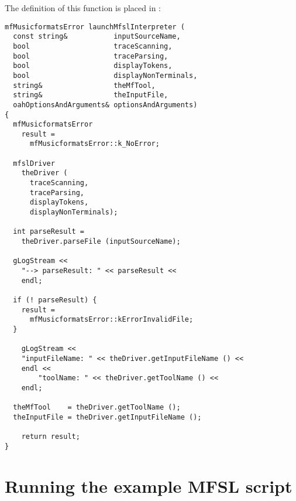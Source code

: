 The definition of this function is placed in :
\begin{lstlisting}[language=Terminal]
mfMusicformatsError launchMfslInterpreter (
  const string&           inputSourceName,
  bool                    traceScanning,
  bool                    traceParsing,
  bool                    displayTokens,
  bool                    displayNonTerminals,
  string&                 theMfTool,
  string&                 theInputFile,
  oahOptionsAndArguments& optionsAndArguments)
{
  mfMusicformatsError
    result =
      mfMusicformatsError::k_NoError;

  mfslDriver
    theDriver (
      traceScanning,
      traceParsing,
      displayTokens,
      displayNonTerminals);

  int parseResult =
  	theDriver.parseFile (inputSourceName);

  gLogStream <<
    "--> parseResult: " << parseResult <<
    endl;

  if (! parseResult) {
    result =
      mfMusicformatsError::kErrorInvalidFile;
  }

	gLogStream <<
    "inputFileName: " << theDriver.getInputFileName () <<
  	endl <<
		"toolName: " << theDriver.getToolName () <<
  	endl;

  theMfTool    = theDriver.getToolName ();
  theInputFile = theDriver.getInputFileName ();

	return result;
}
\end{lstlisting}


\section{Running the example MFSL script}

